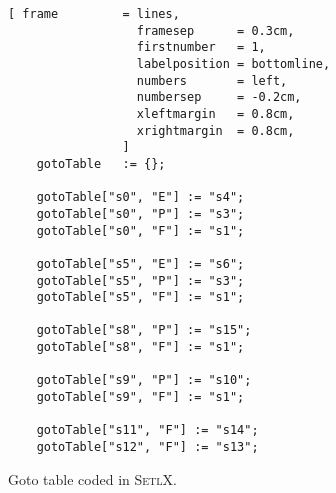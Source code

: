 \begin{figure}[!ht]
\centering
\begin{Verbatim}[ frame         = lines, 
                  framesep      = 0.3cm, 
                  firstnumber   = 1,
                  labelposition = bottomline,
                  numbers       = left,
                  numbersep     = -0.2cm,
                  xleftmargin   = 0.8cm,
                  xrightmargin  = 0.8cm,
                ]
    gotoTable   := {};

    gotoTable["s0", "E"] := "s4";
    gotoTable["s0", "P"] := "s3";
    gotoTable["s0", "F"] := "s1";
    
    gotoTable["s5", "E"] := "s6";
    gotoTable["s5", "P"] := "s3";
    gotoTable["s5", "F"] := "s1";
    
    gotoTable["s8", "P"] := "s15";
    gotoTable["s8", "F"] := "s1";
    
    gotoTable["s9", "P"] := "s10";
    gotoTable["s9", "F"] := "s1";
    
    gotoTable["s11", "F"] := "s14";
    gotoTable["s12", "F"] := "s13";
\end{Verbatim}
\vspace*{-0.3cm}
\caption{Goto table coded in \textsc{SetlX}.}
\label{fig:parse-table.stlx:goto}
\end{figure}


 
